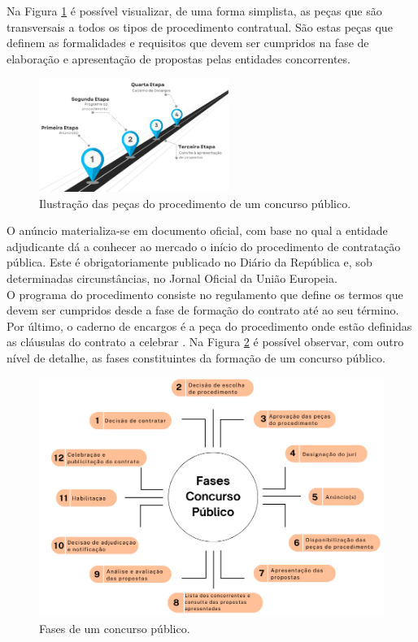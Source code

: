 Na Figura \ref{fig:pecas} é possível visualizar, de uma forma simplista, as peças que são transversais a todos os tipos de procedimento contratual. 
São estas peças que definem as formalidades e requisitos que devem ser cumpridos na fase de elaboração e apresentação de propostas pelas entidades concorrentes. 
\begin{figure}[H]
	\centering
	\includegraphics[width=0.55\textwidth]{imagens/pecasprocedimento.png}
	\caption{Ilustração das peças do procedimento de um concurso público.}
	\label{fig:pecas}
\end{figure}


O anúncio materializa-se em documento oficial, com base no qual a entidade adjudicante dá a conhecer ao mercado o início do procedimento de contratação pública. Este é obrigatoriamente publicado no Diário da República e, sob determinadas circunstâncias, no Jornal Oficial da União Europeia. \\
O programa do procedimento consiste no regulamento que define os termos que devem ser cumpridos desde a fase de formação do contrato até ao seu término\cite{programaproc}. \\
Por último, o caderno de encargos é a peça do procedimento onde estão definidas as cláusulas do contrato a celebrar \cite{caderno}. 
Na Figura \ref{fig:fasescp} é possível observar, com outro nível de detalhe, as fases constituintes da formação de um concurso público. 

\begin{figure}[H]
	\centering
	\includegraphics[width=.8\textwidth]{imagens/fasesconcpub.png}
	\caption{Fases de um concurso público.}
	\label{fig:fasescp}
\end{figure}



